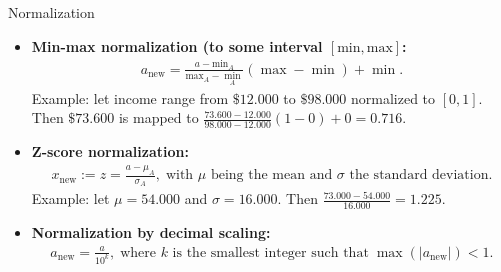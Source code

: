 \documentclass[aspectratio=169,t]{beamer}
\begin{document}
  {
    \begin{frame}{Normalization}
      \begin{itemize}
        \item \textbf{Min-max normalization (to some interval $[\text{min},\text{max}]$:}
        \begin{align}
          a_{\text{new}} = \frac{a - \text{min}_A}{\text{max}_A-\min_{A}} (\max - \min) + \min.
        \end{align}
        Example: let income range from $\$12.000$ to $\$98.000$ normalized to $[0,1]$.\\
        Then $\$73.600$ is mapped to $\frac{73.600-12.000}{98.000-12.000} (1-0) + 0 = 0.716$.
        \item \textbf{Z-score normalization:}
        \begin{align}
          x_{\text{new}} := z = \frac{a-\mu_{A}}{\sigma_A}, \; \text{with $\mu$ being the mean and $\sigma$ the standard deviation.}
        \end{align}
        Example: let $\mu = 54.000$ and $\sigma = 16.000$. Then $\frac{73.000-54.000}{16.000} = 1.225$.
        \item \textbf{Normalization by decimal scaling:}
        \begin{align}
        a_{\text{new}} = \frac{a}{10^k}, \; \text{where $k$ is the smallest integer such that} \; \max(\vert a_{\text{new}} \vert) < 1.
        \end{align}
      \end{itemize}
    \end{frame}
  }
\end{document}
